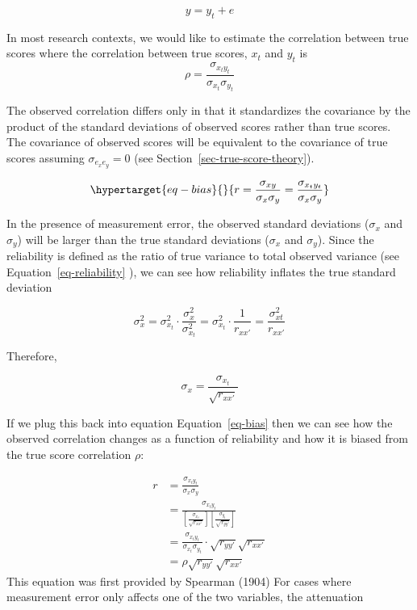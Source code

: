 \documentclass[
  letterpaper,
  DIV=11,
  numbers=noendperiod]{scrreprt}
\begin{document}
\[
y=y_t+e
\]

In most research contexts, we would like to estimate the correlation
between true scores where the correlation between true scores, \(x_t\)
and \(y_t\) is \[
\rho=\frac{\sigma_{x_ty_t}}{\sigma_{x_t} \sigma_{y_t}}
\]

The observed correlation differs only in that it standardizes the
covariance by the product of the standard deviations of observed scores
rather than true scores. The covariance of observed scores will be
equivalent to the covariance of true scores assuming
\(\sigma_{e_x e_y}=0\) (see Section~\ref{sec-true-score-theory}).

\begin{equation}\protect\hypertarget{eq-bias}{}{
r=\frac{\sigma_{xy}}{\sigma_x \sigma_y} = \frac{\sigma_{x_ty_t}}{\sigma_x \sigma_y}
}\label{eq-bias}\end{equation}

In the presence of measurement error, the observed standard deviations
(\(\sigma_x\) and \(\sigma_y\)) will be larger than the true standard
deviations (\(\sigma_x\) and \(\sigma_y\)). Since the reliability is
defined as the ratio of true variance to total observed variance (see
Equation~\ref{eq-reliability} ), we can see how reliability inflates the
true standard deviation

\[
\sigma^2_x =\sigma^2_{x_t} \cdot \frac{\sigma^2_{x}}{\sigma^2_{x_t}} = \sigma^2_{x_t}\cdot\frac{1}{r_{xx'}} = \frac{\sigma^2_{xt}}{r_{xx'}}
\]

Therefore,

\[
\sigma_x = \frac{\sigma_{x_t}}{\sqrt{r_{xx'}}}
\]

If we plug this back into equation Equation~\ref{eq-bias} then we can
see how the observed correlation changes as a function of reliability
and how it is biased from the true score correlation \(\rho\):

\[
\begin{align}
r &= \frac{\sigma_{x_ty_t}}{\sigma_{x} \sigma_{y}} 
\\ &= \frac{\sigma_{x_ty_t}}{\left[\frac{\sigma_{x_t}}{\sqrt{r_{xx'}}} \right] \left[ \frac{\sigma_{y_t}}{\sqrt{r_{yy'}}} \right] } 
\\ &= \frac{\sigma_{x_ty_t}}{\sigma_{x_t}\sigma_{y_t}} \cdot \sqrt{r_{yy'}}\sqrt{r_{xx'}} 
\\ &= \rho\sqrt{r_{yy'}}\sqrt{r_{xx'}}
\end{align}
\] This equation was first provided by Spearman (1904) For cases where
measurement error only affects one of the two variables, the attenuation
\end{document}
